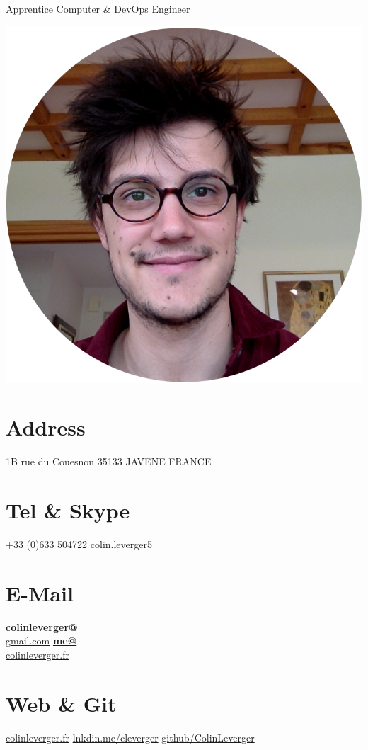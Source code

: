 \documentclass[]{friggeri-cv}
\begin{document}
      {Apprentice Computer \& DevOps Engineer}


\begin{aside}
  \includegraphics[scale=0.14]{img/rounded.png}
  \section{Address}
    1B rue du Couesnon
    35133 JAVENE
    FRANCE
    ~
  \section{Tel \& Skype}
    +33 (0)633 504722
    colin.leverger5
    ~
  \section{E-Mail}
    \href{mailto:colinleverger@gmail.com}{\textbf{colinleverger@}\\gmail.com}
    \href{mailto:me@colinleverger.fr}{\textbf{me@}\\colinleverger.fr}
    ~
  \section{Web \& Git}
    \href{http://www.colinleverger.fr}{colinleverger.fr}
    \href{https://www.linkedin.com/in/colinleverger}{lnkdin.me/cleverger}
    \href{https://github.com/ColinLeverger}{github/ColinLeverger}
    ~

\end{aside}
\end{document}
